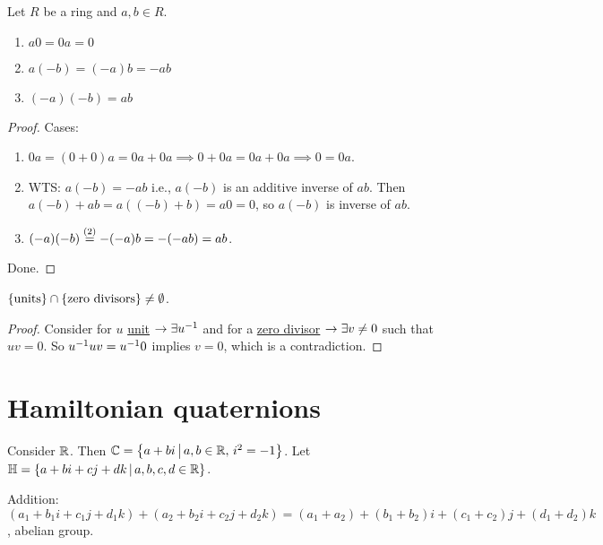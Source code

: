 \documentclass[]{article}
\begin{document}
\newpage
\begin{theorem}
	Let $R$ be a ring and $a,b\in R$.
	\begin{enumerate}
		\item $a0=0a=0$
		\item $a(-b)=(-a)b = -ab$
		\item $(-a)(-b)=ab$
	\end{enumerate}
\end{theorem}
\begin{proof}
	Cases:
	\begin{enumerate}
		\item $0a = (0+0)a = 0a + 0a \implies 0+0a = 0a + 0a \implies 0 = 0a$.
		\item WTS: $a(-b) = -ab$ i.e., $a(-b)$ is an additive inverse of $ab$.
			Then $a(-b)+ab = a((-b)+b) = a0 = 0$, so $a(-b)$ is inverse of $ab$.
		\item $(-a)(-b) \overset{(2)}{=} -(-a)b = -(-ab) = ab$.
	\end{enumerate}
	Done.
\end{proof}

\begin{proposition}
$\left\{ \text{units} \right\}\cap\left\{ \text{zero divisors} \right\}\neq\emptyset$.
\end{proposition}
\begin{proof}
	Consider for $u$ \ul{unit} $\rightarrow\exists u^{-1}$ and for a \ul{zero divisor} $\rightarrow \exists v\neq 0$ such that $uv=0$. 
	So $u^{-1} uv = u^{-1} 0$ implies $v=0$, which is a contradiction.
\end{proof}

\section{Hamiltonian quaternions}

Consider $\mathbb{R}$. 
Then $\mathbb{C} = \left\{ a+bi \, \middle| \, a,b\in\mathbb{R},\, i^2=-1 \right\}$.
Let $\mathbb{H} = \left\{ a+bi+cj+dk \, \middle| \, a,b,c,d\in\mathbb{R} \right\}$.

Addition: $(a_1+b_1i+c_1j+d_1k)+(a_2+b_2i+c_2j+d_2k) = (a_1+a_2)+(b_1+b_2)i+(c_1+c_2)j+(d_1+d_2)k$, abelian group.
\end{document}
